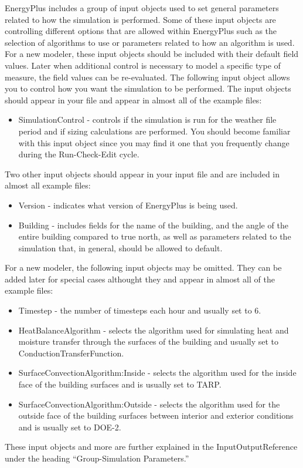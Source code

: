 EnergyPlus includes a group of input objects used to set general parameters
related to how the simulation is performed. Some of these input objects
are controlling different options that are allowed within EnergyPlus
such as the selection of algorithms to use or parameters related to
how an algorithm is used. For a new modeler, these input objects should
be included with their default field values. Later when additional
control is necessary to model a specific type of measure, the field
values can be re-evaluated. The following input object allows you
to control how you want the simulation to be performed. The input
objects should appear in your file and appear in almost all of the
example files:
\begin{itemize}
\item SimulationControl - controls if the simulation is run for the weather
file period and if sizing calculations are performed. You should become
familiar with this input object since you may find it one that you
frequently change during the Run-Check-Edit cycle.
\end{itemize}
Two other input objects should appear in your input file and are included
in almost all example files:
\begin{itemize}
\item Version - indicates what version of EnergyPlus is being used.
\item Building - includes fields for the name of the building, and the angle
of the entire building compared to true north, as well as parameters
related to the simulation that, in general, should be allowed to default.
\end{itemize}
For a new modeler, the following input objects may be omitted. They
can be added later for special cases althought they and appear in
almost all of the example files:
\begin{itemize}
\item Timestep - the number of timesteps each hour and usually set to 6.
\item HeatBalanceAlgorithm - selects the algorithm used for simulating heat
and moisture transfer through the surfaces of the building and usually
set to ConductionTransferFunction.
\item SurfaceConvectionAlgorithm:Inside - selects the algorithm used for
the inside face of the building surfaces and is usually set to TARP.
\item SurfaceConvectionAlgorithm:Outside - selects the algorithm used for
the outside face of the building surfaces between interior and exterior
conditions and is usually set to DOE-2.
\end{itemize}
These input objects and more are further explained in the InputOutputReference
under the heading ``Group-Simulation Parameters.''

